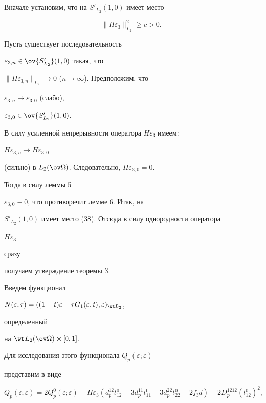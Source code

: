 \begin{pf} Вначале установим, что на $S'_{L_2}(1,0)$ имеет место 


\begin{equation} 


\|H\varepsilon_3\|^2_{L_2}\ge c>0. 


\end{equation} 


Пусть существует последовательность 


$\varepsilon_{3,n}\in\ov{S'_{L_2}}(1,0)$ такая, что 


$\|H\varepsilon_{3,n}\|_{L_2}\to 0$ ($n\to\infty$). Предположим, что 


$\varepsilon_{3,n}\to\varepsilon_{3,0}$ (слабо), 


$\varepsilon_{3,0}\in\ov{S'_{L_2}}(1,0)$. 


В силу усиленной непрерывности оператора $H\varepsilon_3$ имеем: 


$H\varepsilon_{3,n}\to H\varepsilon_{3,0}$ 


(сильно) в $L_2(\ov\Omega)$. Следовательно, $H\varepsilon_{3,0}=0$. 


Тогда в силу леммы 5\; 


$\varepsilon_{3,0}\equiv 0$, что противоречит лемме 6. Итак, на 


$S'_{L_2}(1,0)$ имеет место (38). Отсюда в силу однородности оператора 


$H\varepsilon_3$ 


сразу 


получаем утверждение теоремы 3. 


\end{pf} 


 


Введем функционал 


$N(\varepsilon,\tau)=((1-t)\varepsilon-\tau 


G_1(\varepsilon,t),\varepsilon)_{\wt L_2}$, 


определенный 


на $\wt L_2(\ov\Omega)\times[0,1]$. 


Для исследования этого функционала $Q_p(\varepsilon;\varepsilon)$ 


представим в виде 


\begin{equation} 


Q_p(\varepsilon;\varepsilon)=2Q^0_p(\varepsilon;\varepsilon)- 


H\varepsilon_3(d^{12}_p t^0_{12}-3d^{11}_p t^0_{11}- 


3d^{22}_p t^0_{22}-2f_3d)-2D^{1212}_p(t^0_{12})^2, 


\end{equation} 



